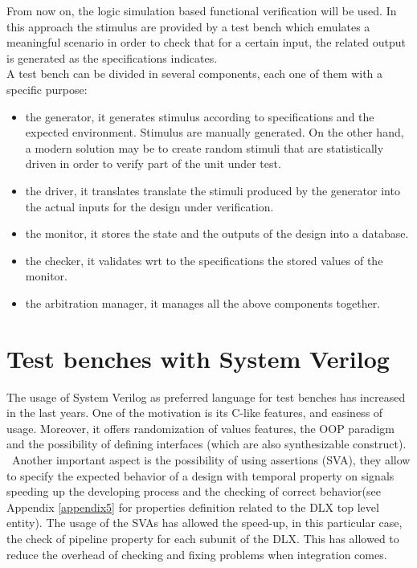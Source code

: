 From now on, the logic simulation based functional verification will be used. In this approach the stimulus are provided by a test bench which emulates a meaningful scenario in order to check that for a certain input, the related output is generated as the specifications indicates.\\
A test bench can be divided in several components, each one of them with a specific purpose:
\begin{itemize}
\item the generator, it generates stimulus according to specifications and the expected environment.
Stimulus are manually generated. On the other hand, a modern solution may be to create random stimuli that are statistically driven in order to verify part of the unit under test.
\item the driver, it translates translate the stimuli produced by the generator into the actual inputs for the design under verification.
\item the monitor, it stores the state and the outputs of the design into a database.
\item the checker, it validates wrt to the specifications the stored values of the monitor.
\item the arbitration manager, it manages all the above components together.
\end{itemize}

\section{Test benches with System Verilog}
The usage of System Verilog as preferred language for test benches has increased in the last years. One of the motivation is its C-like features, and easiness of usage. Moreover, it offers randomization of values features, the OOP paradigm and the possibility of defining interfaces (which are also synthesizable construct).\\\
Another important aspect is the possibility of using assertions (SVA), they allow to specify the expected behavior of a design with temporal property on signals speeding up the developing process and the checking of correct behavior(see Appendix \ref{appendix5} for properties definition related to the DLX top level entity). The usage of the SVAs has allowed the speed-up, in this particular case, the check of pipeline property for each subunit of the DLX. This has allowed to reduce the overhead of checking and fixing problems when integration comes.\\

